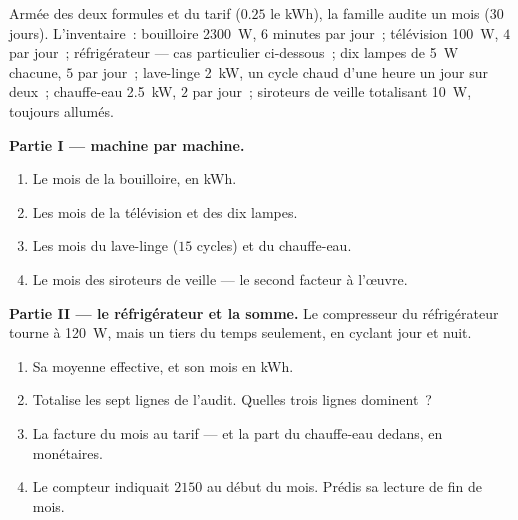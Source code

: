 \begin{problem}\label{pb:g9:electric-power-energy:1}
Armée des deux formules et du tarif ($0.25$ le \unit{kWh}), la
famille audite un mois (30 jours). L'inventaire~: bouilloire
\qty{2300}{W}, $6$ minutes par jour~; télévision \qty{100}{W}, $4$
 par jour~; réfrigérateur --- cas particulier ci-dessous~; dix
lampes de \qty{5}{W} chacune, $5$  par jour~; lave-linge
\qty{2}{kW}, un cycle chaud d'une heure un jour sur deux~;
chauffe-eau \qty{2.5}{kW}, $2$  par jour~; siroteurs de veille
totalisant \qty{10}{W}, toujours allumés.

\medskip\noindent\textbf{Partie I --- machine par machine.}
\begin{enumerate}
  \item Le mois de la bouilloire, en \unit{kWh}.
  \item Les mois de la télévision et des dix lampes.
  \item Les mois du lave-linge ($15$ cycles) et du chauffe-eau.
  \item Le mois des siroteurs de veille --- le second facteur à
        l'œuvre.
\end{enumerate}

\medskip\noindent\textbf{Partie II --- le réfrigérateur et la
somme.}
Le compresseur du réfrigérateur tourne à \qty{120}{W}, mais un tiers
du temps seulement, en cyclant jour et nuit.
\begin{enumerate}[resume]
  \item Sa  moyenne effective, et son mois en \unit{kWh}.
  \item Totalise les sept lignes de l'audit. Quelles trois lignes
        dominent~?
  \item La facture du mois au tarif --- et la part du chauffe-eau
        dedans, en  monétaires.
  \item Le compteur indiquait $2150$  au début du mois.
        Prédis sa lecture de fin de mois.
\end{enumerate}


\end{problem}
